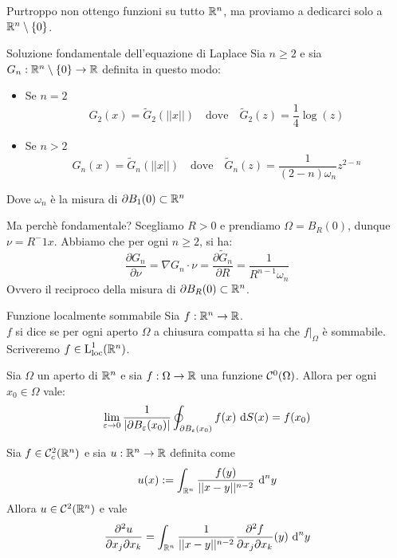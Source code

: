 \documentclass{article}
\begin{document}
Purtroppo non ottengo funzioni su tutto $\mathbb{R}^n$, ma proviamo a dedicarci solo a $\mathbb{R}^n\setminus\{0\}$.

\begin{definition}{Soluzione fondamentale dell'equazione di Laplace}{}
    Sia $n\ge 2$ e sia $G_n : \mathbb{R}^n\setminus\{0\}\to\mathbb{R}$ definita in questo modo:\begin{itemize}
        \item Se $n=2$ \[G_2(x) = \tilde{G}_2(||x||) \quad \text{dove} \quad \tilde{G}_2(z) = \frac{1}{4}\log(z)\]
        \item Se $n>2$ \[G_n(x) = \tilde{G}_n(||x||) \quad \text{dove} \quad \tilde{G}_n(z) =\frac{1}{(2-n)\omega_n} z^{2-n}\]
    \end{itemize}
    Dove $\omega_n$ è la misura di $\partial B_1(0)\subset \mathbb{R}^n$
\end{definition}

\begin{remark}{Ma perchè fondamentale?}{}
    Scegliamo $R>0$ e prendiamo $\Omega = B_R(0)$, dunque $\nu = R^-1 x$. Abbiamo che per ogni $n\ge 2$, si ha:
    \[\frac{\partial G_n}{\partial \nu} = \nabla G_n \cdot \nu = \frac{\partial \tilde{G}_n}{\partial R} =\frac{1}{R^{n-1}\omega_n}\]
    Ovvero il reciproco della misura di $\partial B_R(0)\subset \mathbb{R}^n$.
\end{remark}

\begin{definition}{Funzione localmente sommabile}{}
    Sia $f:\mathbb{R}^n \to \mathbb{R}$.\\
    $f$ si dice  se per ogni aperto $\Omega$ a chiusura compatta si ha che $f|_\Omega$ è sommabile.\\
    Scriveremo $f \in \operatorname{L}_{\text{loc}}^1(\mathbb{R}^n)$.
\end{definition}

\begin{lemma}{}{}
    Sia $\Omega$ un aperto di $\mathbb{R}^n$ e sia $f:\Omega\to\mathbb{R}$ una funzione $\mathcal{C}^0(\Omega)$. Allora per ogni $x_0 \in \Omega$ vale:
    \[\lim_{\varepsilon\to 0} \frac{1}{|\partial B_\varepsilon (x_0)|}\oint_{\partial B_\varepsilon(x_0)}f(x)\text{ d} S(x) = f(x_0)\]
\end{lemma}

\begin{lemma}{}{}
    Sia $f \in \mathcal{C}^2_c(\mathbb{R}^n)$ e sia $u:\mathbb{R}^n\to\mathbb{R}$ definita come
    \[u(x) := \int_{\mathbb{R}^n} \frac{f(y)}{||x-y||^{n-2}}\text{ d}^n y\]
    Allora $u\in\mathcal{C}^2(\mathbb{R}^n)$ e vale
    \[\frac{\partial^2 u}{\partial x_j \partial x_k} = \int_{\mathbb{R}^n} \frac{1}{||x-y||^{n-2}}\frac{\partial^2 f}{\partial x_j\partial x_k}(y)\text{ d}^n y\]
\end{lemma}
\end{document}
